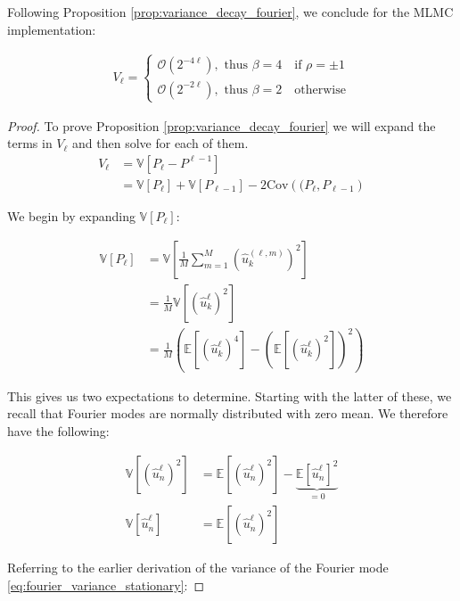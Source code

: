 Following Proposition \ref{prop:variance_decay_fourier}, we conclude 
for the MLMC implementation:

\begin{align*}
    V_\ell = 
    \begin{cases}
        \mathcal{O}\left(2^{-4\ell}\right), \text{  thus } \beta = 4 \quad \text{if } \rho = \pm 1\\
        \mathcal{O}\left(2^{-2\ell}\right), \text{  thus } \beta = 2 \quad \text{otherwise}
    \end{cases}
\end{align*}

\begin{proof}
    To prove Proposition \ref{prop:variance_decay_fourier} we will expand the terms in
    $V_\ell$ and then 
    solve for each of them.
    \begin{align*}
    V_\ell &= \mathbb{V}[P_\ell - P^{\ell - 1}]\\
    &= \mathbb{V}[P_\ell] + 
        \mathbb{V}[P_{\ell-1}] - 
        2 \mathrm{Cov}\left((P_\ell, P_{\ell - 1}\right)
    \end{align*}

    We begin by expanding $\mathbb{V}[P_\ell]$:

    \begin{align*}
        \mathbb{V}[P_\ell] &= 
        \mathbb{V}\left[\frac{1}{M}\sum_{m=1}^M
        \left(\hat{u}_k^{(\ell, m)}\right)^2\right] \\
        &= \frac{1}{M}\mathbb{V}\left[ (\hat{u}_k^\ell)^2 \right]\\
        &= \frac{1}{M}\left(\mathbb{E}[(\hat{u}_k^\ell)^4] 
        - \left(\mathbb{E}[(\hat{u}_k^\ell)^2]\right)^2\right)
    \end{align*}

    This gives us two expectations to determine. 
    Starting with the latter of these, we recall that 
    Fourier modes are normally distributed with 
    zero mean.
    We therefore have the following:

    \begin{align*}
        \mathbb{V}[(\hat{u}_n^\ell)^2] &= 
        \mathbb{E}[(\hat{u}_n^\ell)^2] - 
        \underbrace{\mathbb{E}[\hat{u}_n^\ell]^2}_{=0}\\
        \mathbb{V}[\hat{u}_n^\ell] &= \mathbb{E}[(\hat{u}_n^\ell)^2]
    \end{align*}

    Referring to the earlier derivation of the variance 
    of the Fourier mode \eqref{eq:fourier_variance_stationary}:
    

\end{proof}
